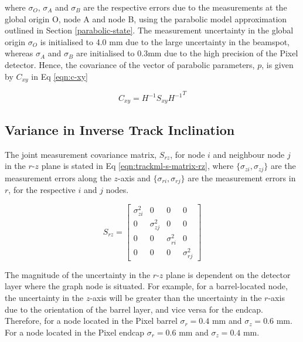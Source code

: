 where $\sigma_O$, $\sigma_A$ and $\sigma_B$ are the respective errors due to the measurements at the global origin O, node A and node B, using the parabolic model approximation outlined in Section \ref{parabolic-state}. The measurement uncertainty in the global origin $\sigma_O$ is initialised to 4.0 mm due to the large uncertainty in the beamspot, whereas $\sigma_A$ and $\sigma_B$ are initialised to 0.3mm due to the high precision of the Pixel detector. Hence, the covariance of the vector of parabolic parameters, $p$, is given by $C_{xy}$ in Eq \eqref{eqn:c-xy}

\begin{equation}
    C_{xy} = H^{-1}S_{xy}{H^{-1}}^{T}
    \label{eqn:c-xy}
\end{equation}






\subsection{Variance in Inverse Track Inclination}
\label{variance-in-inverse-track-inclination}

The joint measurement covariance matrix, $S_{rz}$, for node $i$ and neighbour node $j$ in the $r$-$z$ plane is stated in Eq \eqref{eqn:trackml-s-matrix-rz}, where $\{ \sigma_{zi}, \sigma_{zj} \}$ are the measurement errors along the $z$-axis and $\{ \sigma_{ri}, \sigma_{rj} \}$ are the measurement errors in $r$, for the respective $i$ and $j$ nodes. 

\begin{equation}
    S_{rz} = \begin{bmatrix} \sigma_{zi}^{2} & 0 & 0 & 0 \\ 
                             0 & \sigma_{zj}^{2} & 0 & 0 \\ 
                             0 & 0 & \sigma_{ri}^{2} & 0 \\
                             0 & 0 & 0 & \sigma_{rj}^{2}
                            \end{bmatrix} 
    \label{eqn:trackml-s-matrix-rz}
\end{equation}


The magnitude of the uncertainty in the $r$-$z$ plane is dependent on the detector layer where the graph node is situated. For example, for a barrel-located node, the uncertainty in the $z$-axis will be greater than the uncertainty in the $r$-axis due to the orientation of the barrel layer, and vice versa for the endcap. Therefore, for a node located in the Pixel barrel $\sigma_r = 0.4$ mm and $\sigma_z = 0.6$ mm. For a node located in the Pixel endcap $\sigma_r = 0.6$ mm and $\sigma_z = 0.4$ mm.

